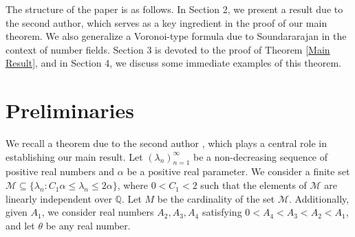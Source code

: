 \documentclass[reqno]{amsart}
\numberwithin{equation}{section}
\theoremstyle{plain}
\begin{document}
The structure of the paper is as follows. In Section 2, we present a result due to the second author, which serves as a key ingredient in the proof of our main theorem. We also generalize a Voronoi-type formula due to Soundararajan 
\cite{Sound} in the context of number fields. Section 3 is devoted to the proof of Theorem \ref{Main Result}, and in Section 4, we discuss some immediate examples of this theorem.


	\section{Preliminaries}
		 We recall a theorem due to the second author \cite{K. Mahatab}, which plays a central role in establishing our main result. Let $(\lambda_n)_{n=1}^{\infty}$ be a non-decreasing sequence of positive real numbers  and $\alpha$ be a positive real parameter. We consider a finite set $\mathcal{M}\subseteq \{\lambda_n: C_1 \alpha \leq \lambda_n\leq 2\alpha\}$, where $0<C_1<2$ such that the elements of $\mathcal{M}$ are linearly independent over $\mathbb{Q}$. Let $M$ be the cardinality of the set $\mathcal{M}$. Additionally, given $A_1$, we consider real numbers $A_2, A_3, A_4$ satisfying $0 < A_4 < A_3 < A_2 < A_1$, and let $\theta$ be any real number.
		 
\end{document}
